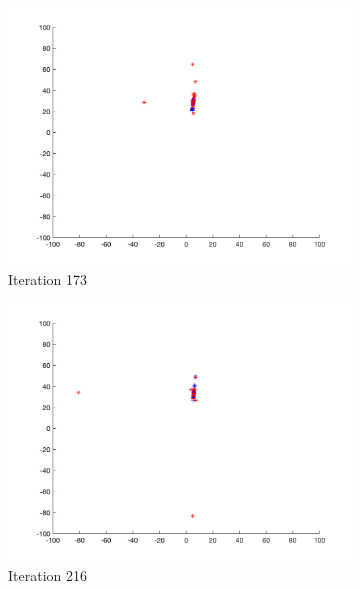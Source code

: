 \begin{figure}
\begin{subfigure}[b]{0.4\textwidth}
    \includegraphics[width=\textwidth]{img/smpl/rosn2d-9-100/loa-iter-173}
    \caption{Iteration 173}
    \label{fig:s6-iter-4}
  \end{subfigure}
  \begin{subfigure}[b]{0.4\textwidth}
    \includegraphics[width=\textwidth]{img/smpl/rosn2d-9-100/loa-iter-216}
    \caption{Iteration 216}
    \label{fig:s6-iter-5}
  \end{subfigure}
  \begin{subfigure}[b]{0.4\textwidth}

\end{subfigure}
\end{figure}
